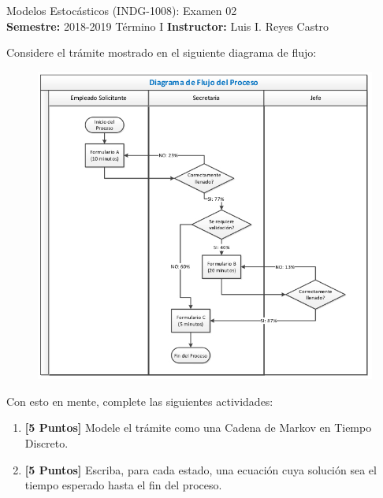 \documentclass[ a4paper, twoside, 11pt]{article}
\newcommand{\numero}{02}
\begin{document}
\allowdisplaybreaks



\begin{center}
\Large Modelos Estoc\'asticos (INDG-1008): Examen \numero \\[1ex]
\small \textbf{Semestre:} 2018-2019 T\'ermino I \qquad
\textbf{Instructor:} Luis I. Reyes Castro
\end{center}
\fullskip

\begin{problem}
Considere el tr\'amite mostrado en el siguiente diagrama de flujo: 
\begin{figure}[H]
\centering
\includegraphics[width = 0.88\columnwidth]{figures/fig_burocracia.jpg}
\end{figure}

Con esto en mente, complete las siguientes actividades: 
\begin{enumerate}[label=\textbf{\alph*)}]
\item \textbf{[5 Puntos]} Modele el tr\'amite como una Cadena de Markov en Tiempo Discreto. 
\item \textbf{[5 Puntos]} Escriba, para cada estado, una ecuaci\'on cuya soluci\'on sea el tiempo esperado hasta el fin del proceso. 
\end{enumerate}

\QED

\end{problem}
\fullskip
\end{document}
